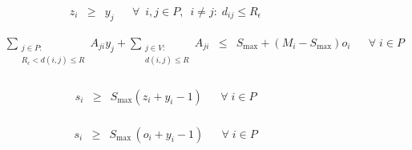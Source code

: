 \begin{figure}
		
		
		\begin{equation} \label{eq:set.z}
		\begin{array}{rrclcl}
		& z_{i} & \geq & y_{j} && \forall \ \; i , j \in P, \;\  i \neq j : \; d_{ij} \le R_{\epsilon} 
		\end{array}
		\end{equation}
		
		
		\begin{equation} \label{eq:setSub}
		\begin{array}{rrclcl}
		& \displaystyle \sum_{\substack{j \in P :\\ R_{\epsilon} < d(i,j) \le R }} A_{ji} y_{j} + \displaystyle \sum_{\substack{j \in V :\\ d(i,j) \le R }} A_{ji} & \leq & S_{\max} + (M_i - S_{\max}) o_i %
		&& \forall \; i \in P\\
		\end{array}
		\end{equation}
		
		
		\begin{equation} \label{eq:setSmaxZ}
		\begin{array}{rrclcl}
		&s_{i} & \geq & S_{\max} ( z_{i} + y_i - 1 ) && \forall \; i \in P \\
		\end{array}
		\end{equation}
		
		\begin{equation} \label{eq:setSmaxO}
		\begin{array}{rrclcl}
		&s_{i} & \geq & S_{\max} \,( o_{i} + y_{i} - 1 ) && \forall \; i \in P \\
		\end{array}
		\end{equation}
		

\end{figure}
